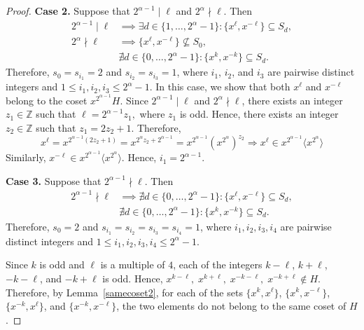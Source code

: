 \documentclass[12pt]{article}
\begin{document}
\begin{proof}
\medskip

\textbf{Case 2.} Suppose that $2^{\alpha-1} \mid \ell$ and $2^{\alpha} \nmid \ell$. Then
\begin{align*}
	2^{\alpha-1} \mid \ell &\implies \exists d \in \{1, \dots, 2^{\alpha}-1\} : \{x^{\ell}, x^{-\ell}\} \subseteq S_d, \\
	2^{\alpha} \nmid \ell &\implies \{x^{\ell}, x^{-\ell}\} \not\subseteq S_0, \\
    &\nexists d \in \{0, \dots, 2^{\alpha}-1\} : \{x^k, x^{-k}\} \subseteq S_d.
\end{align*}
Therefore, $s_0=s_{i_1}=2$ and $s_{i_2} = s_{i_3} = 1$,
where \(i_1\), \(i_2\), and \(i_3\) are pairwise distinct integers and
\(1\le i_1,i_2,i_3\le 2^{\alpha}-1\). In this case, we show that both \(x^{\ell}\) and \(x^{-\ell}\) belong to the coset
\(x^{2^{\alpha-1}}H\). Since
\(2^{\alpha-1}\mid \ell\) and \(2^{\alpha}\nmid \ell\), there exists an integer
\(z_1\in\mathbb{Z}\) such that
$
\ell=2^{\alpha-1}z_1,
$
where \(z_1\) is odd. Hence, there exists an integer
\(z_2\in\mathbb{Z}\) such that
$
z_1=2z_2+1.
$
Therefore,
\[
x^{\ell}
=x^{2^{\alpha-1}(2z_2+1)}
=x^{2^{\alpha}z_2+2^{\alpha-1}}
=x^{2^{\alpha-1}}\left(x^{2^{\alpha}}\right)^{z_2} \Longrightarrow
x^{\ell}\in x^{2^{\alpha-1}}\langle x^{2^{\alpha}}\rangle
\]
Similarly,
$
x^{-\ell}\in x^{2^{\alpha-1}}\langle x^{2^{\alpha}}\rangle.
$
Hence,
$
i_1=2^{\alpha-1}.
$	
\medskip

\textbf{Case 3.} Suppose that $2^{\alpha-1} \nmid \ell$. Then
\begin{align*}
	2^{\alpha-1} \nmid \ell &\implies \nexists d \in \{0, \dots, 2^{\alpha}-1\} : \{x^{\ell}, x^{-\ell}\} \subseteq S_d, \\
	&\nexists d \in \{0, \dots, 2^{\alpha}-1\} : \{x^k, x^{-k}\} \subseteq S_d.
\end{align*}
Therefore, $s_0=2$ and $s_{i_1} = s_{i_2} = s_{i_3} = s_{i_4} = 1$, where $i_1, i_2, i_3, i_4$ are pairwise distinct integers and $1 \le i_1, i_2, i_3, i_4 \le 2^{\alpha}-1$.

Since $k$ is odd and $\ell$ is a multiple of $4$, each of the integers \(k-\ell\), \(k+\ell\), \(-k-\ell\), and \(-k+\ell\) is odd. Hence,
$
x^{k-\ell},\; x^{k+\ell},\; x^{-k-\ell},\; x^{-k+\ell}\notin H.
$
Therefore, by Lemma~\ref{samecoset2}, for each of the sets $\{x^{k},x^{\ell}\}$, $\{x^{k},x^{-\ell}\}$, $\{x^{-k},x^{\ell}\}$, and $\{x^{-k},x^{-\ell}\}$, the two elements do not belong to the same coset of $H$.


\end{proof}
\end{document}

